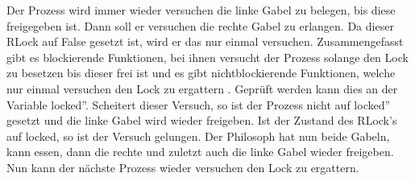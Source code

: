 Der Prozess wird immer wieder versuchen die linke Gabel zu belegen, bis diese freigegeben ist. Dann soll er versuchen die rechte Gabel zu erlangen. Da dieser RLock auf False gesetzt ist, wird er das nur einmal versuchen. Zusammengefasst gibt es blockierende Funktionen, bei ihnen versucht der Prozess solange den Lock zu besetzen bis dieser frei ist und es gibt nichtblockierende Funktionen, welche nur einmal versuchen den Lock zu ergattern \parencite [vgl.][S.164]{sturm2001}. Geprüft werden kann dies an der Variable \glqq locked''. Scheitert dieser Versuch, so ist der Prozess nicht auf \glqq locked'' gesetzt und die linke Gabel wird wieder freigeben. Ist der Zustand des RLock's auf locked, so ist der Versuch gelungen.  Der Philosoph hat nun beide Gabeln, kann essen, dann die rechte und zuletzt auch die linke Gabel wieder freigeben. Nun kann der nächste Prozess wieder versuchen den Lock zu ergattern.
 







